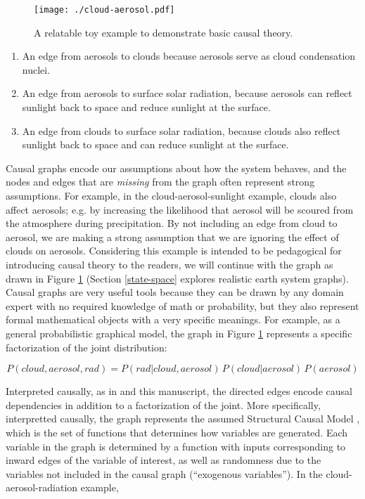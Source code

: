 \documentclass[12pt]{article}
\begin{document}
\begin{figure}
  \texttt{[image: ./cloud-aerosol.pdf]}\\
  \caption{A relatable toy example to demonstrate basic causal theory.}
  \label{fig:toy}
\end{figure}

\begin{enumerate}
\item An edge from aerosols to clouds because aerosols serve as cloud
  condensation nuclei.
\item An edge from aerosols to surface solar radiation, because
  aerosols can reflect sunlight back to space and reduce sunlight
  at the surface.
\item An edge from clouds to surface solar radiation, because clouds
  also reflect sunlight back to space and can reduce sunlight at
  the surface.
\end{enumerate}

Causal graphs encode our assumptions about how the system behaves, and
the nodes and edges that are \textit{missing} from the graph often
represent strong assumptions. For example, in the
cloud-aerosol-sunlight example, clouds also affect aerosols; e.g. by
increasing the likelihood that aerosol will be scoured from the
atmosphere during precipitation. By not including an edge from cloud
to aerosol, we are making a strong assumption that we are ignoring the
effect of clouds on aerosols. Considering this example is intended to
be pedagogical for introducing causal theory to the readers, we will
continue with the graph as drawn in Figure \ref{fig:toy} (Section
\ref{state-space} explores realistic earth system graphs). Causal
graphs are very useful tools because they can be drawn by any domain
expert with no required knowledge of math or probability, but they
also represent formal mathematical objects with a very specific
meanings. For example, as a general probabilistic graphical model, the
graph in Figure \ref{fig:toy} represents a specific factorization of
the joint distribution:

\begin{equation}
  P(cloud, aerosol, rad) = P(rad | cloud, aerosol) \, P(cloud |
  aerosol) \,
  P(aerosol)
\end{equation}

Interpreted causally, as in \citet{pearl1995causal} and this
manuscript, the directed edges encode causal dependencies in addition
to a factorization of the joint. More specifically, interpretted
causally, the graph represents the assumed Structural Causal Model
\citet[SCM,][]{pearl2009}, which is the set of functions that
determines how variables are generated. Each variable in the graph is
determined by a function with inputs corresponding to inward edges of
the variable of interest, as well as randomness due to the variables
not included in the causal graph (``exogenous variables'').  In the
cloud-aerosol-radiation example,
\end{document}
